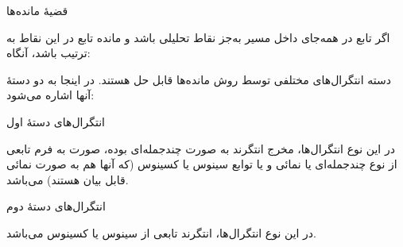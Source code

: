 \begin{EMtheorem}{قضیهٔ مانده‌ها}

اگر تابع  در همه‌جای داخل مسیر  به‌جز نقاط  تحلیلی باشد و مانده تابع در این نقاط به ترتیب  باشد، آنگاه:

\end{EMtheorem}

دسته انتگرال‌های مختلفی توسط روش مانده‌ها قابل حل هستند. در اینجا به دو دستهٔ آنها اشاره می‌شود:

\begin{EMdefinition}{انتگرال‌های دستهٔ اول}

در این نوع انتگرال‌ها، مخرج انتگرند به صورت چندجمله‌ای بوده، صورت به فرم تابعی از نوع چندجمله‌ای یا نمائی و یا توابع سینوس یا کسینوس (که آنها هم به صورت نمائی قابل بیان هستند) می‌باشد.

\end{EMdefinition}

\begin{EMdefinition}{انتگرال‌های دستهٔ دوم}

در این نوع انتگرال‌ها، انتگرند تابعی از سینوس یا کسینوس می‌باشد.

\end{EMdefinition}

\EMhold


